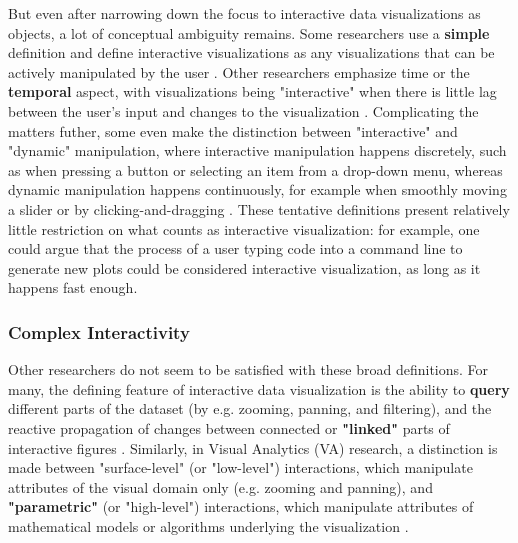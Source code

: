 \documentclass[12pt,a4paper]{article}
\begin{document}
But even after narrowing down the focus to interactive data visualizations as objects, a lot of conceptual ambiguity remains. Some researchers use a \textbf{simple} definition and define interactive visualizations as any visualizations that can be actively manipulated by the user \citep{brodbeck2009}. Other researchers emphasize time or the \textbf{temporal} aspect, with visualizations being "interactive" when there is little lag between the user's input and changes to the visualization \citep{becker1987,buja1996}. Complicating the matters futher, some even make the distinction between "interactive" and "dynamic" manipulation, where interactive manipulation happens discretely, such as when pressing a button or selecting an item from a drop-down menu, whereas dynamic manipulation happens continuously, for example when smoothly moving a slider or by clicking-and-dragging \citep{rheingans2002,jankun2007model}. These tentative definitions present relatively little restriction on what counts as interactive visualization: for example, one could argue that the process of a user typing code into a command line to generate new plots could be considered interactive visualization, as long as it happens fast enough. 

\subsubsection{Complex Interactivity}

Other researchers do not seem to be satisfied with these broad definitions. For many, the defining feature of interactive data visualization is the ability to \textbf{query} different parts of the dataset (by e.g. zooming, panning, and filtering), and the reactive propagation of changes between connected or \textbf{"linked"} parts of interactive figures \citep{kehrer2012,buja1996,keim2002,unwin1999}. Similarly, in Visual Analytics (VA) research, a distinction is made between "surface-level" (or "low-level") interactions, which manipulate attributes of the visual domain only (e.g. zooming and panning), and \textbf{"parametric"} (or "high-level") interactions, which manipulate attributes of mathematical models or algorithms underlying the visualization \citep{leman2013,pike2009}. 
\end{document}

